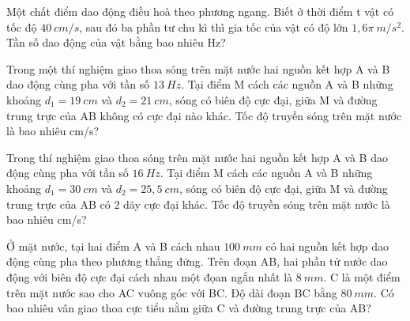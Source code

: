 \begin{ex}%
	Một chất điểm dao động điều hoà theo phương ngang. Biết ở thời điểm t vật có tốc độ $40\ cm/s$, sau đó ba phần tư chu kì thì gia tốc của vật có độ lớn $1,6\pi\ m/s^2$. Tần số dao động của vật bằng bao nhiêu Hz?\\
\end{ex}
\begin{ex}
	Trong một thí nghiệm giao thoa sóng trên mặt nước hai nguồn kết hợp A và B dao động cùng pha với tần số $13 \ Hz$. Tại điểm M cách các nguồn A và B những khoảng $d_1=19 \ cm$ và $d_2=21 \ cm$, sóng có biên độ cực đại, giữa M và đường trung trực của AB không có cực đại nào khác. Tốc độ truyền sóng trên mặt nước là bao nhiêu cm/s?
\end{ex}
\begin{ex}
	Trong thí nghiệm giao thoa sóng trên mặt nước hai nguồn kết hợp A và B dao động cùng pha với tần số $16 \ Hz$. Tại điểm M cách các nguồn A và B những khoảng $d_1=30 \ cm$ và $d_2=25,5 \ cm$, sóng có biên độ cực đại, giữa M và đường trung trực của AB có $2$ dãy cực đại khác. Tốc độ truyền sóng trên mặt nước là bao nhiêu cm/s?
\end{ex}
\begin{ex}
	Ở mặt nước, tại hai điểm A và B cách nhau $100 \ mm$ có hai nguồn kết hợp dao động cùng pha theo phương thẳng đứng. Trên đoạn AB, hai phần tử nước dao động với biên độ cực đại cách nhau một đọan ngắn nhất là $8 \ mm$. C là một điểm trên mặt nước sao cho AC vuông góc với BC. Độ dài đoạn BC bằng $80 \ mm$. Có bao nhiêu vân giao thoa cực tiểu nằm giữa C và đường trung trực của AB?
\end{ex}